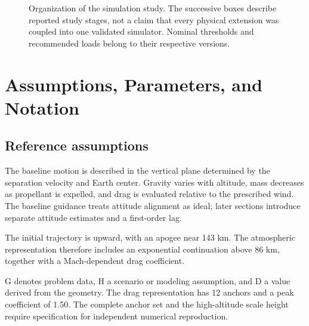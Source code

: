 \documentclass[11pt,a4paper]{article}
\begin{document}
\begin{figure}[htbp]
\centering
{}
\caption{Organization of the simulation study. The successive boxes describe reported study stages, not a claim that every physical extension was coupled into one validated simulator. Nominal thresholds and recommended loads belong to their respective versions.}
\label{fig:workflow}
\end{figure}

\section{Assumptions, Parameters, and Notation}
\subsection{Reference assumptions}
The baseline motion is described in the vertical plane determined by the separation velocity and Earth center. Gravity varies with altitude, mass decreases as propellant is expelled, and drag is evaluated relative to the prescribed wind. The baseline guidance treats attitude alignment as ideal; later sections introduce separate attitude estimates and a first-order lag.

The initial trajectory is upward, with an apogee near 143 km. The atmospheric representation therefore includes an exponential continuation above 86 km, together with a Mach-dependent drag coefficient.



G denotes problem data, H a scenario or modeling assumption, and D a value derived from the geometry. The drag representation has 12 anchors and a peak coefficient of 1.50. The complete anchor set and the high-altitude scale height require specification for independent numerical reproduction.
\end{document}
